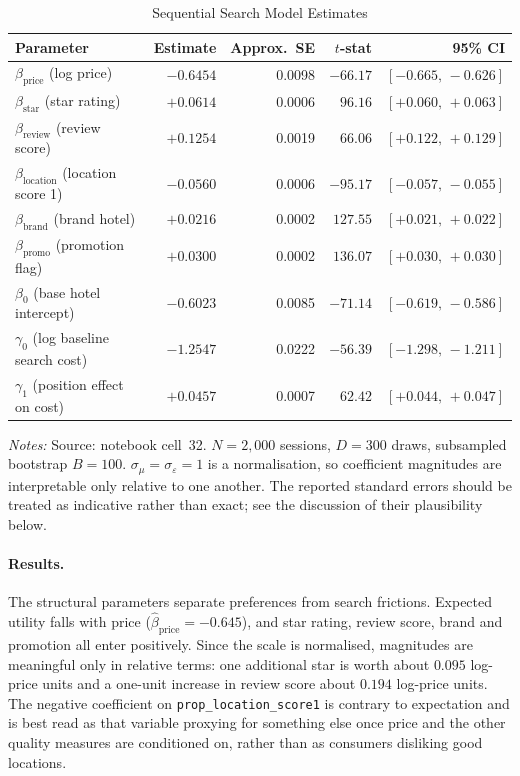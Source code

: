 \documentclass[11pt]{article}
\newcommand{\code}[1]{\texttt{\small #1}}
\begin{document}
\begin{table}[htbp]
  \centering
  \caption{Sequential Search Model Estimates}
  \label{tab:structural}
  \small
  \begin{tabular}{lrrrr}
    \toprule
    Parameter & Estimate & Approx.\ SE & $t$-stat & 95\% CI \\
    \midrule
    $\beta_{\text{price}}$ (log price)      & $-0.6454$ & 0.0098 & $-66.17$ & $[-0.665,\,-0.626]$ \\
    $\beta_{\text{star}}$ (star rating)     & $+0.0614$ & 0.0006 & $96.16$  & $[+0.060,\,+0.063]$ \\
    $\beta_{\text{review}}$ (review score)  & $+0.1254$ & 0.0019 & $66.06$  & $[+0.122,\,+0.129]$ \\
    $\beta_{\text{location}}$ (location score 1) & $-0.0560$ & 0.0006 & $-95.17$ & $[-0.057,\,-0.055]$ \\
    $\beta_{\text{brand}}$ (brand hotel)    & $+0.0216$ & 0.0002 & $127.55$ & $[+0.021,\,+0.022]$ \\
    $\beta_{\text{promo}}$ (promotion flag) & $+0.0300$ & 0.0002 & $136.07$ & $[+0.030,\,+0.030]$ \\
    $\beta_0$ (base hotel intercept)        & $-0.6023$ & 0.0085 & $-71.14$ & $[-0.619,\,-0.586]$ \\
    $\gamma_0$ (log baseline search cost)   & $-1.2547$ & 0.0222 & $-56.39$ & $[-1.298,\,-1.211]$ \\
    $\gamma_1$ (position effect on cost)    & $+0.0457$ & 0.0007 & $62.42$  & $[+0.044,\,+0.047]$ \\
    \bottomrule
  \end{tabular}
  \vspace{0.6ex}
  \begin{minipage}{0.95\textwidth}
  \footnotesize \textit{Notes:} Source: notebook cell~32. $N = 2{,}000$
  sessions, $D = 300$ draws, subsampled bootstrap $B = 100$. $\sigma_\mu =
  \sigma_\varepsilon = 1$ is a normalisation, so coefficient magnitudes are
  interpretable only relative to one another. The reported standard errors
  should be treated as indicative rather than exact; see the discussion of
  their plausibility below.
  \end{minipage}
\end{table}

\paragraph{Results.} The structural parameters separate preferences from search
frictions. Expected utility falls with price ($\hat\beta_{\text{price}} =
-0.645$), and star rating, review score, brand and promotion all enter
positively. Since the scale is normalised, magnitudes are meaningful only in
relative terms: one additional star is worth about $0.095$ log-price units and
a one-unit increase in review score about $0.194$ log-price units. The negative
coefficient on \code{prop\_location\_score1} is contrary to expectation and is
best read as that variable proxying for something else once price and the other
quality measures are conditioned on, rather than as consumers disliking good
locations.
\end{document}
